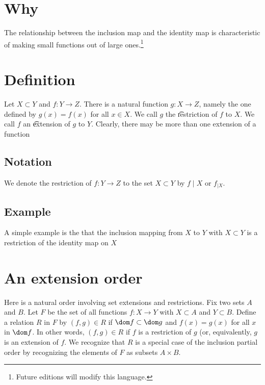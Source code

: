 

\section*{Why}

The relationship between the inclusion map and the identity map is characteristic of making small functions out of large ones.\footnote{Future editions will modify this language.}

\section*{Definition}

Let $X \subset Y$ and $f: Y \to Z$.
There is a natural function $g: X \to Z$, namely the one defined by $g(x) = f(x)$ for all $x \in X$.
We call $g$ the \t{restriction} of $f$ to $X$.
We call $f$ an \t{extension} of $g$ to $Y$.
Clearly, there may be more than one extension of a function

\subsection*{Notation}

We denote the restriction of $f: Y \to Z$ to the set $X \subset Y$ by $f\mid X$ or $f_{\mid X}$.

\subsection*{Example}

A simple example is the that the inclusion mapping from $X$ to $Y$ with $X \subset Y$ is a restriction of the identity map on $X$

\section*{An extension order}

Here is a natural order involving set extensions and restrictions.
Fix two sets $A$ and $B$.
Let $F$ be the set of all functions $f: X \to Y$ with $X \subset A$ and $Y \subset B$.
Define a relation $R$ in $F$ by $(f, g) \in R$ if $\dom f \subset \dom g$ and $f(x) = g(x)$ for all $x$ in $\dom f$.
In other words, $(f, g) \in R$ if $f$ is a restriction of $g$ (or, equivalently, $g$ is an extension of $f$.
We recognize that $R$ is a special case of the inclusion partial order by recognizing the elements of $F$ as subsets $A \times B$.

\blankpage